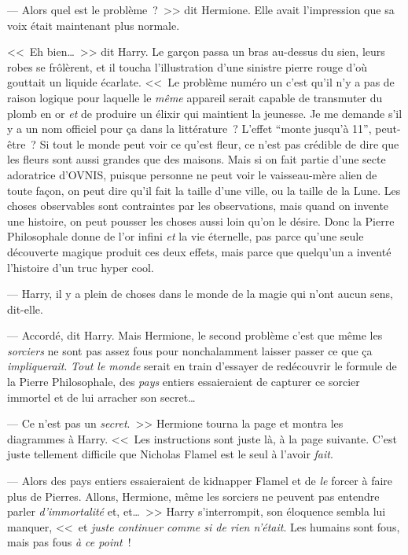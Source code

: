 --- Alors quel est le problème~?~>> dit Hermione. Elle avait l'impression que sa voix était maintenant plus normale.

<<~Eh bien…~>> dit Harry. Le garçon passa un bras au-dessus du sien, leurs robes se frôlèrent, et il toucha l'illustration d'une sinistre pierre rouge d'où gouttait un liquide écarlate. <<~Le problème numéro un c'est qu'il n'y a pas de raison logique pour laquelle le \emph{même} appareil serait capable de transmuter du plomb en or \emph{et} de produire un élixir qui maintient la jeunesse. Je me demande s'il y a un nom officiel pour ça dans la littérature~? L'effet “monte jusqu'à 11”, peut-être~? Si tout le monde peut voir ce qu'est fleur, ce n'est pas crédible de dire que les fleurs sont aussi grandes que des maisons. Mais si on fait partie d'une secte adoratrice d'OVNIS, puisque personne ne peut voir le vaisseau-mère alien de toute façon, on peut dire qu'il fait la taille d'une ville, ou la taille de la Lune. Les choses observables sont contraintes par les observations, mais quand on invente une histoire, on peut pousser les choses aussi loin qu'on le désire. Donc la Pierre Philosophale donne de l'or infini \emph{et} la vie éternelle, pas parce qu'une seule découverte magique produit ces deux effets, mais parce que quelqu'un a inventé l'histoire d'un truc hyper cool.

--- Harry, il y a plein de choses dans le monde de la magie qui n'ont aucun sens, dit-elle.

--- Accordé, dit Harry. Mais Hermione, le second problème c'est que même les \emph{sorciers} ne sont pas assez fous pour nonchalamment laisser passer ce que ça \emph{impliquerait}. \emph{Tout le monde} serait en train d'essayer de redécouvrir le formule de la Pierre Philosophale, des \emph{pays} entiers essaieraient de capturer ce sorcier immortel et de lui arracher son secret…

--- Ce n'est pas un \emph{secret}.~>> Hermione tourna la page et montra les diagrammes à Harry. <<~Les instructions sont juste là, à la page suivante. C'est juste tellement difficile que Nicholas Flamel est le seul à l'avoir \emph{fait}.

--- Alors des pays entiers essaieraient de kidnapper Flamel et de \emph{le} forcer à faire plus de Pierres. Allons, Hermione, même les sorciers ne peuvent pas entendre parler \emph{d'immortalité} et, et…~>> Harry s'interrompit, son éloquence sembla lui manquer, <<~et \emph{juste continuer comme si de rien n'était}. Les humains sont fous, mais pas fous \emph{à ce point}~!

